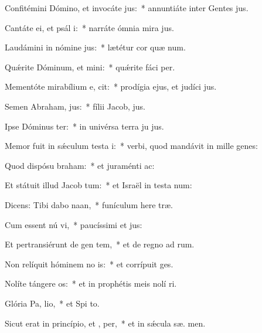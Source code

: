 \item Confitémini Dómino, et invocáte  jus:~* annuntiáte inter Gentes  jus.
\item Cantáte ei, et psál i:~* narráte ómnia mira jus.
\item Laudámini in nómine  jus:~* lætétur cor quæ num.
\item Quǽrite Dóminum, et mini:~* quǽrite fáci  per.
\item Mementóte mirabílium e,  cit:~* prodígia ejus, et judíci  jus.
\item Semen Abraham,  jus:~* fílii Jacob,  jus.
\item Ipse Dóminus  ter:~* in univérsa terra ju jus.
\item Memor fuit in sǽculum testa i:~* verbi, quod mandávit in mille genes:
\item Quod dispósu  braham:~* et juraménti   ac:
\item Et státuit illud Jacob  tum:~* et Israël in testa num:
\item Dicens: Tibi dabo  naan,~* funículum here træ.
\item Cum essent nú vi,~* paucíssimi et  jus:
\item Et pertransiérunt de gen  tem,~* et de regno ad  rum.
\item Non relíquit hóminem no is:~* et corrípuit   ges.
\item Nolíte tángere  os:~* et in prophétis meis nolí ri.
\item Glória Pa,  lio,~* et Spi to.
\item Sicut erat in princípio, et ,  per,~* et in sǽcula sæ. men.
